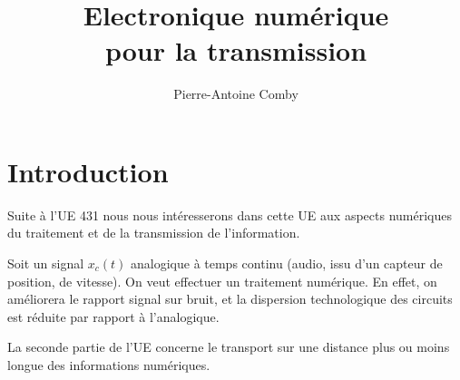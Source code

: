 \documentclass[openany]{../../cours}
\title{ Electronique numérique\\ pour la transmission}
\author{Pierre-Antoine Comby}
\begin{document}
\maketitle
\tableofcontents
\newpage
\chapter*{Introduction}

Suite à l'UE 431 nous nous intéresserons dans cette UE aux aspects numériques du traitement et de la transmission de l'information.

\begin{exemple}
Soit un signal $x_c(t)$ analogique à temps continu (audio, issu d'un capteur de position, de vitesse). On veut effectuer un traitement numérique. En effet, on améliorera le rapport signal sur bruit, et la dispersion technologique des circuits est réduite par rapport à l'analogique.
\begin{center}
\end{center}
\end{exemple}

La seconde partie de l'UE concerne le transport sur une distance plus ou moins longue des informations numériques.

\begin{center}
\end{center}
\end{document}
